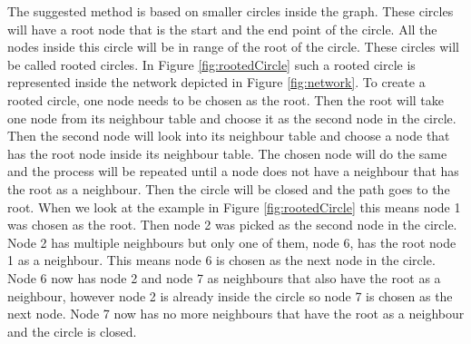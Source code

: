 The suggested method is based on smaller circles inside the graph. These circles will have a root node that is the start and the end point of the circle. All the nodes inside this circle will be in range of the root of the circle. These circles will be called rooted circles. In Figure \ref{fig:rootedCircle} such a rooted circle is represented inside the network depicted in Figure \ref{fig:network}. To create a rooted circle, one node needs to be chosen as the root. Then the root will take one node from its neighbour table and choose it as the second node in the circle.  Then the second node will look into its neighbour table and choose a node that has the root node inside its neighbour table. The chosen node will do the same and the process will be repeated until a node does not have a neighbour that has the root as a neighbour. Then the circle will be closed and the path goes to the root. When we look at the example in Figure \ref{fig:rootedCircle} this means node 1 was chosen as the root. Then node 2 was picked as the second node in the circle. Node 2 has multiple neighbours but only one of them, node 6, has the root node 1 as a neighbour. This means node 6 is chosen as the next node in the circle. Node 6 now has node 2 and node 7 as neighbours that also have the root as a neighbour, however node 2 is already inside the circle so node 7 is chosen as the next node. Node 7 now has no more neighbours that have the root as a neighbour and the circle is closed.

